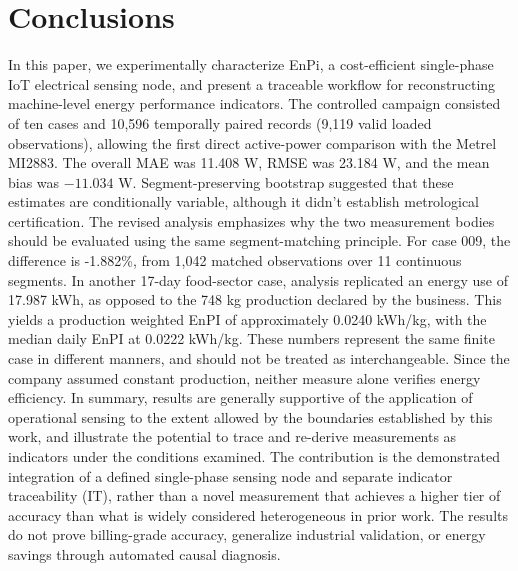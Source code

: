 \documentclass[technologies,article,submit,pdftex,moreauthors]{Definitions/mdpi}
\begin{document}
\section{Conclusions}
\label{sec:conclusions}
In this paper, we experimentally characterize EnPi, a cost-efficient single-phase IoT electrical sensing node, and present a traceable workflow for reconstructing machine-level energy performance indicators. The controlled campaign consisted of ten cases and 10,596 temporally paired records (9,119 valid loaded observations), allowing the first direct active-power comparison with the Metrel MI2883. The overall MAE was 11.408 W, RMSE was 23.184 W, and the mean bias was $-11.034$ W. Segment-preserving bootstrap suggested that these estimates are conditionally variable, although it didn’t establish metrological certification. The revised analysis emphasizes why the two measurement bodies should be evaluated using the same segment-matching principle. For case 009, the difference is -1.882\%, from 1,042 matched observations over 11 continuous segments. In another 17-day food-sector case,  analysis replicated an energy use of 17.987 kWh, as opposed to the 748 kg production declared by the business. This yields a production weighted EnPI of approximately 0.0240 kWh/kg, with the median daily EnPI at 0.0222 kWh/kg. These numbers represent the same finite case in different manners, and should not be treated as interchangeable. Since the company assumed constant production, neither measure alone verifies energy efficiency.
In summary, results are generally supportive of the application of operational sensing to the extent allowed by the boundaries established by this work, and illustrate the potential to trace and re-derive measurements as indicators under the conditions examined. The contribution is the demonstrated integration of a defined single-phase sensing node and separate indicator traceability (IT), rather than a novel measurement that achieves a higher tier of accuracy than what is widely considered heterogeneous in prior work. The results do not prove billing-grade accuracy, generalize industrial validation, or energy savings through automated causal diagnosis. 

\end{document}
